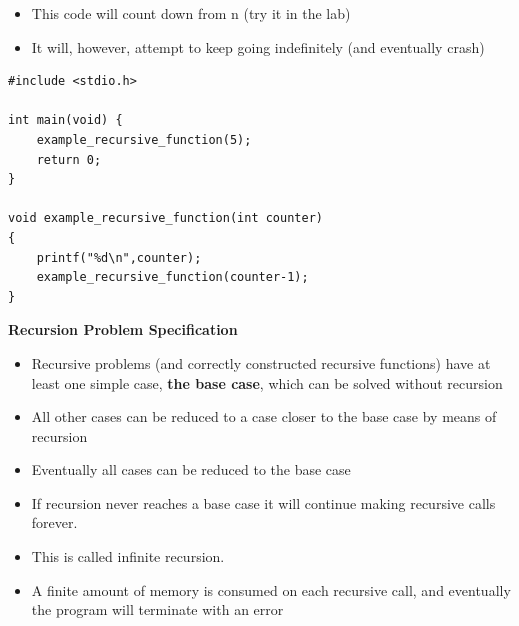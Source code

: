 \documentclass{beamer}
\begin{document}
\begin{frame}[fragile]
\begin{itemize}
\item This code will count down from n (try it in the lab) 
\item It will, however, attempt to keep going indefinitely (and eventually crash)
\end{itemize}

\begin{block}{}
\begin{lstlisting}
#include <stdio.h>

int main(void) {
    example_recursive_function(5);
    return 0;
}

void example_recursive_function(int counter)
{
    printf("%d\n",counter);
    example_recursive_function(counter-1);
}
\end{lstlisting}
\end{block}
\end{frame}

\begin{frame}
 
\textbf{Recursion Problem Specification}
 
\begin{itemize}
\item Recursive problems (and correctly constructed recursive functions) have at least one simple case, \textbf{the base case}, which can be solved without recursion
\item All other cases can be reduced to a case closer to the base case by means of recursion\newline
\item Eventually all cases can be reduced to the base case 
\item If recursion never reaches a base case it will continue making recursive calls forever.
\item This is called infinite recursion. 
\item A finite amount of memory is consumed on each recursive call, and eventually the program will terminate with an error
\end{itemize}
\end{frame}
\end{document}
